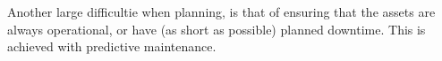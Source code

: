 Another large difficultie when planning, is that of ensuring that the assets are always operational, or have (as short as possible) planned downtime. This is achieved with predictive maintenance.
%

